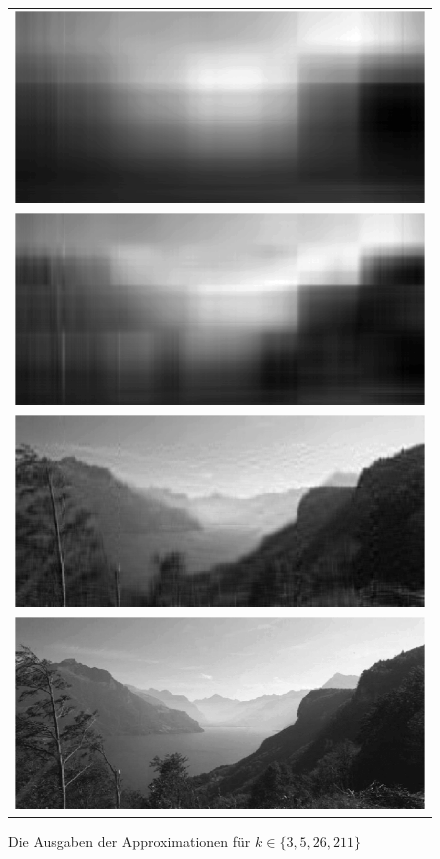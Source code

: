 \documentclass{mywork}
\begin{document}
\begin{aufgabe}
\begin{enumerate}[a)]
			\begin{figure}[h]
				\centering
				\caption{Die Ausgaben der Approximationen für $k\in \{3,5,26,211\} $ }
				\begin{tabular}{c}
					\includegraphics[scale=0.4]{num1_6_4/k3.png} 
					\\ \includegraphics[scale=0.4]{num1_6_4/k5.png} \\
					\includegraphics[scale=0.4]{num1_6_4/k26.png} 
					\\ \includegraphics[scale=0.4]{num1_6_4/k211.png}
				\end{tabular}
			\end{figure}
	\end{enumerate}
\end{aufgabe}
\end{document}
